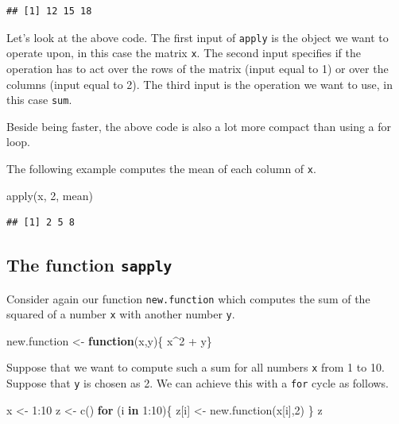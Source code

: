 \documentclass[
]{book}
\newenvironment{Shaded}{\begin{snugshade}}{\end{snugshade}}
\newcommand{\ControlFlowTok}[1]{\textcolor[rgb]{0.13,0.29,0.53}{\textbf{#1}}}
\newcommand{\DecValTok}[1]{\textcolor[rgb]{0.00,0.00,0.81}{#1}}
\newcommand{\FunctionTok}[1]{\textcolor[rgb]{0.00,0.00,0.00}{#1}}
\newcommand{\NormalTok}[1]{#1}
\newcommand{\OtherTok}[1]{\textcolor[rgb]{0.56,0.35,0.01}{#1}}
\newcommand{\SpecialCharTok}[1]{\textcolor[rgb]{0.00,0.00,0.00}{#1}}
\begin{document}
\begin{verbatim}
## [1] 12 15 18
\end{verbatim}

Let's look at the above code. The first input of \texttt{apply} is the object we want to operate upon, in this case the matrix \texttt{x}. The second input specifies if the operation has to act over the rows of the matrix (input equal to 1) or over the columns (input equal to 2). The third input is the operation we want to use, in this case \texttt{sum}.

Beside being faster, the above code is also a lot more compact than using a for loop.

The following example computes the mean of each column of \texttt{x}.

\begin{Shaded}
\begin{Highlighting}[]
\FunctionTok{apply}\NormalTok{(x, }\DecValTok{2}\NormalTok{, mean)}
\end{Highlighting}
\end{Shaded}

\begin{verbatim}
## [1] 2 5 8
\end{verbatim}

\hypertarget{the-function-sapply}{%
\subsection{\texorpdfstring{The function \texttt{sapply}}{The function sapply}}\label{the-function-sapply}}

Consider again our function \texttt{new.function} which computes the sum of the squared of a number \texttt{x} with another number \texttt{y}.

\begin{Shaded}
\begin{Highlighting}[]
\NormalTok{new.function }\OtherTok{\textless{}{-}} \ControlFlowTok{function}\NormalTok{(x,y)\{ x}\SpecialCharTok{\^{}}\DecValTok{2} \SpecialCharTok{+}\NormalTok{ y\}}
\end{Highlighting}
\end{Shaded}

Suppose that we want to compute such a sum for all numbers \texttt{x} from 1 to 10. Suppose that \texttt{y} is chosen as 2. We can achieve this with a \texttt{for} cycle as follows.

\begin{Shaded}
\begin{Highlighting}[]
\NormalTok{x }\OtherTok{\textless{}{-}} \DecValTok{1}\SpecialCharTok{:}\DecValTok{10}
\NormalTok{z }\OtherTok{\textless{}{-}} \FunctionTok{c}\NormalTok{()}
\ControlFlowTok{for}\NormalTok{ (i }\ControlFlowTok{in} \DecValTok{1}\SpecialCharTok{:}\DecValTok{10}\NormalTok{)\{}
\NormalTok{  z[i] }\OtherTok{\textless{}{-}} \FunctionTok{new.function}\NormalTok{(x[i],}\DecValTok{2}\NormalTok{)}
\NormalTok{\}}
\NormalTok{z}
\end{Highlighting}
\end{Shaded}
\end{document}
